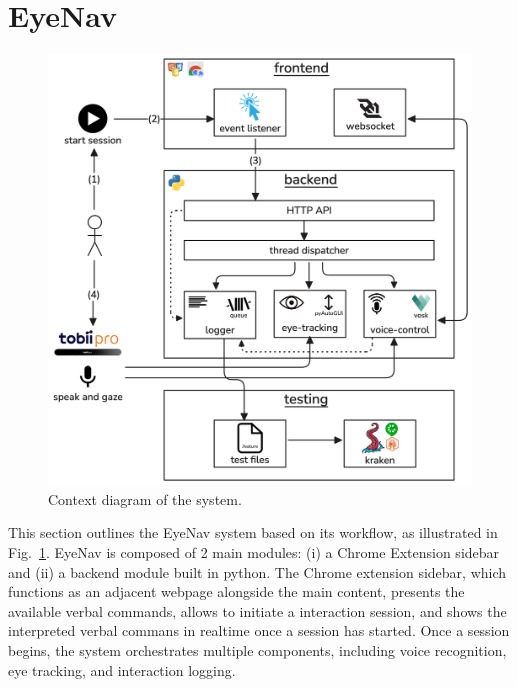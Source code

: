 
\section{EyeNav}

\begin{figure}[h]
	\centering
	\vspace{-10pt}
	\includegraphics[width=0.8\linewidth]{imgs/diagram-context.png}
	\caption{Context diagram of the system.}
	\label{fig:context}
\end{figure}

This section outlines the EyeNav system based on its workflow, as illustrated in Fig.~\ref{fig:context}. EyeNav is composed of 2 main modules: (i) a Chrome Extension sidebar and (ii) a backend module built in python. The Chrome extension sidebar, which functions as an adjacent webpage alongside the main content, presents the available verbal commands, allows to initiate a interaction session, and shows the interpreted verbal commans in realtime once a session has started. Once a session begins, the system orchestrates multiple components, including voice recognition, eye tracking, and interaction logging.


